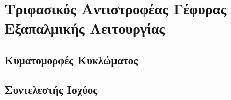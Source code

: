 \section{Τριφασικός Αντιστροφέας Γέφυρας Εξαπαλμικής Λειτουργίας}







\subsection{Κυματομορφές Κυκλώματος}





\subsection{Συντελεστής Ισχύος}